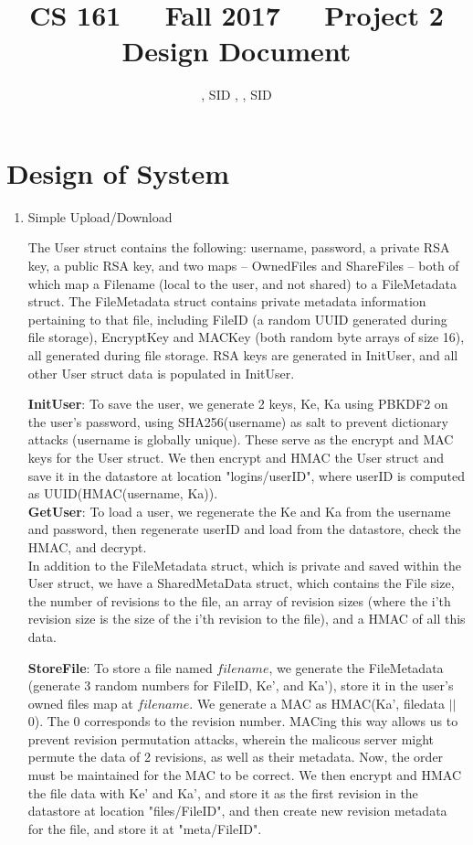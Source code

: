 \documentclass[11pt]{article}
\title{CS 161\ \ \ Fall 2017\ \ \ Project 2 Design Document}
\author{\NameA, SID \SIDA, \NameB, SID \SIDB}
\date{}
\begin{document}
\maketitle

\section{Design of System}
\begin{enumerate}
\item{Simple Upload/Download}

The User struct contains the following: username, password, a private RSA key, a public RSA key, and two maps -- OwnedFiles and ShareFiles -- both of which map a Filename (local to the user, and not shared) to a FileMetadata struct. The FileMetadata struct contains private metadata information pertaining to that file, including FileID (a random UUID generated during file storage), EncryptKey and MACKey (both random byte arrays of size 16), all generated during file storage. RSA keys are generated in InitUser, and all other User struct data is populated in InitUser.

\textbf{InitUser}: To save the user, we generate 2 keys, Ke, Ka using PBKDF2 on the user's password, using SHA256(username) as salt to prevent dictionary attacks (username is globally unique). These serve as the encrypt and MAC keys for the User struct. We then encrypt and HMAC the User struct and save it in the datastore at location "logins/userID", where userID is computed as UUID(HMAC(username, Ka)).\\

\textbf{GetUser}: To load a user, we regenerate the Ke and Ka from the username and password, then regenerate userID and load from the datastore, check the HMAC, and decrypt.\\
In addition to the FileMetadata struct, which is private and saved within the User struct, we have a SharedMetaData struct, which contains the File size, the number of revisions to the file, an array of revision sizes (where the i'th revision size is the size of the i'th revision to the file), and a HMAC of all this data.

\textbf{StoreFile}: To store a file named $filename$, we generate the FileMetadata (generate 3 random numbers for FileID, Ke', and Ka'), store it in the user's owned files map at $filename$. We generate a MAC as HMAC(Ka', filedata $||$\ $0$). The $0$ corresponds to the revision number. MACing this way allows us to prevent revision permutation attacks, wherein the malicous server might permute the data of 2 revisions, as well as their metadata. Now, the order must be maintained for the MAC to be correct. We then encrypt and HMAC the file data with Ke' and Ka', and store it as the first revision in the datastore at location "files/FileID", and then create new revision metadata for the file, and store it at "meta/FileID".\\


\end{enumerate}
\end{document}
